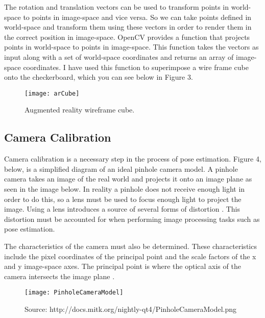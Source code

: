 \documentclass{article}
\begin{document}
The rotation and translation vectors can be used to transform points in world-space to points in image-space and vice versa. So we can take points defined in world-space and transform them using these vectors in order to render them in the correct position in image-space. OpenCV provides a function that projects points in world-space to points in image-space. This function takes the vectors as input along with a set of world-space coordinates and returns an array of image-space coordinates. I have used this function to superimpose a wire frame cube onto the checkerboard, which you can see below in Figure 3.


\begin{figure}[H]
\begin{center}
\texttt{[image: arCube]} 
\caption{Augmented reality wireframe cube.}
\end{center}
\end{figure}

\subsection{Camera Calibration}

Camera calibration is a necessary step in the process of pose estimation. Figure 4, below, is a simplified diagram of an ideal pinhole camera model. A pinhole camera takes an image of the real world and projects it onto an image plane \cite{pinhole} as seen in the image below. In reality a pinhole does not receive enough light in order to do this, so a lens must be used to focus enough light to project the image. Using a lens introduces a source of several forms of distortion \cite{calib1}. This distortion must be accounted for when performing image processing tasks such as pose estimation. \par

The characteristics of the camera must also be determined. These characteristics include the pixel coordinates of the principal point and the scale factors of the x and y image-space axes. The principal point is where the optical axis of the camera intersects the image plane \cite{wikicalib}.

\vspace*{2\baselineskip}

\begin{figure}[H]
\begin{center}
\texttt{[image: PinholeCameraModel]}
\caption{Source: http://docs.mitk.org/nightly-qt4/PinholeCameraModel.png}
\end{center}
\end{figure}
\end{document}

